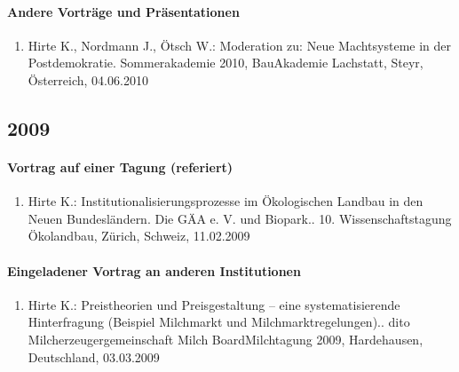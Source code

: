 \paragraph{Andere Vorträge und Präsentationen}
\begin{enumerate}
	\item Hirte K., Nordmann J., Ötsch W.: Moderation zu: Neue Machtsysteme in der Postdemokratie. Sommerakademie 2010, BauAkademie Lachstatt, Steyr, Österreich, 04.06.2010
\end{enumerate}
\subsection*{2009}

    \paragraph{Vortrag auf einer Tagung (referiert)}
\begin{enumerate}
	\item Hirte K.: Institutionalisierungsprozesse im Ökologischen Landbau in den Neuen Bundesländern. Die GÄA e. V. und Biopark.. 10. Wissenschaftstagung Ökolandbau, Zürich, Schweiz, 11.02.2009
\end{enumerate}
\paragraph{Eingeladener Vortrag an anderen Institutionen}
\begin{enumerate}
	\item Hirte K.: Preistheorien und Preisgestaltung – eine systematisierende Hinterfragung (Beispiel Milchmarkt und Milchmarktregelungen).. dito Milcherzeugergemeinschaft Milch BoardMilchtagung 2009, Hardehausen, Deutschland, 03.03.2009
\end{enumerate}
